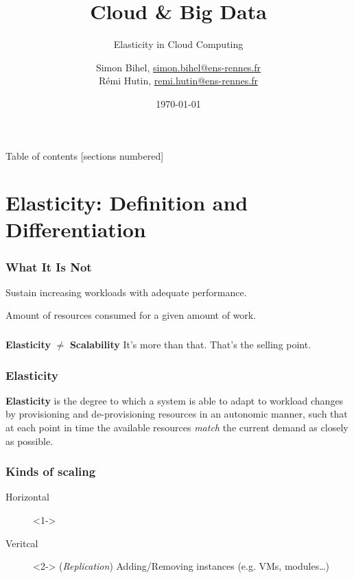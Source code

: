 \documentclass{beamer}
\title{Cloud \& Big Data}
\subtitle{Elasticity in Cloud Computing}
\date{\today}
\author{%
  Simon Bihel, \url{simon.bihel@ens-rennes.fr} \\
  Rémi Hutin, \url{remi.hutin@ens-rennes.fr}
}
\institute{%
  University of Rennes I \\
  École normale supérieure de Rennes
}
\begin{document}
\maketitle

\begin{frame}{Table of contents}
  [sections numbered]
  \tableofcontents[hideallsubsections]
\end{frame}


\section{Elasticity: Definition and Differentiation}
\begin{frame}
  \frametitle{What It Is Not~\cite{herbst2013elasticity}}
  \begin{description}
    \parbox{\linewidth}{%
    \item[Scalability] Sustain increasing workloads with adequate performance.
    \item[Efficiency] Amount of resources consumed for a given amount of work.
    }
  \end{description}
\end{frame}


\begin{frame}
  \frametitle{}
  \centering
  \Large\textbf{Elasticity} $\neq$ \textbf{Scalability}
  \pause{}
  It's more than that. That's the selling point.
\end{frame}

\begin{frame}
  \frametitle{Elasticity~\cite{herbst2013elasticity}~\cite{galante2012survey}~\cite{gulati2011cloud}~\cite{sharma2011cost}~\cite{moore2013coordinated}}
  \begin{definition}
  \parbox{\linewidth}{\textbf{Elasticity} is the degree to which a system is able to adapt to workload changes by provisioning and de-provisioning resources in an autonomic manner, such that at each point in time the available resources \textit{match} the current demand as closely as possible.
  }
  \end{definition}
\end{frame}

\begin{frame}
  \frametitle{Kinds of scaling}
  \begin{description}
    \item[Horizontal]<1->
    \item[Veritcal]<2-> (\textit{Replication}) Adding/Removing instances (e.g. VMs, modules\dots)
  \end{description}
\end{frame}
\end{document}
